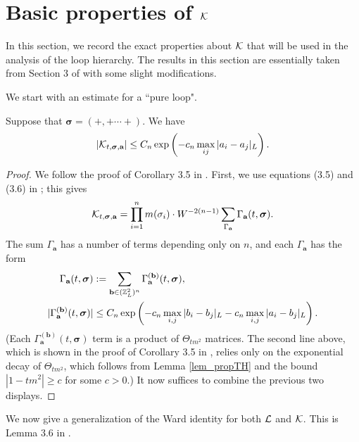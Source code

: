 \section{Basic properties of \texorpdfstring{$\cal K$}{K}}\label{Sec:CalK}


In this section, we record the exact properties about ${\cal K}$ that will be used in the analysis of the loop hierarchy. The results in this section are essentially taken from Section 3 of \cite{YY_25} with some slight modifications. 

We start with an estimate for a ``pure loop".
\begin{lemma}\label{lem_pureloop} Suppose that $\boldsymbol{\sigma}=(+,+\cdots +)$. We have 
\begin{align}\label{res_pureKes}\left|{\cal K}_{t, \boldsymbol{\sigma}, \textbf{a}}\right|\le C_n \exp\left(-c_n\max_{ij}|a_i-a_j|_{L}\right).
\end{align} 
\end{lemma}
\begin{proof}
We follow the proof of Corollary 3.5 in \cite{YY_25}. First, we use equations (3.5) and (3.6) in \cite{YY_25}; this gives 
%
\begin{align*}
{\cal K}_{t,\boldsymbol{\sigma}, \textbf{a}}=\prod_{i=1}^{n}m(\sigma_{i})\cdot W^{-2(n-1)}\sum_{\Gamma_{\textbf{a}}}\Gamma_{\textbf{a}}(t,\boldsymbol{\sigma}).
\end{align*}
%
The sum $\Gamma_{\textbf{a}}$ has a number of terms depending only on $n$, and each $\Gamma_{\textbf{a}}$ has the form
%
\begin{align*}
\Gamma_{\textbf{a}}(t,\boldsymbol{\sigma})&:=\sum_{\textbf{b}\in(\mathbb{Z}_{L}^{2})^{n}}\Gamma^{(\textbf{b})}_{\textbf{a}}(t,\boldsymbol{\sigma}),\\
|\Gamma^{(\textbf{b})}_{\textbf{a}}(t,\boldsymbol{\sigma})|&\leq C_{n}\exp\left(-c_{n}\max_{i,j}|b_{i}-b_{j}|_{L}-c_{n}\max_{i,j}|a_{i}-b_{j}|_{L}\right).
\end{align*}
%
(Each $\Gamma^{(\textbf{b})}_{\textbf{a}}(t,\boldsymbol{\sigma})$ term is a product of $\Theta_{tm^{2}}$ matrices. The second line above, which is shown in the proof of Corollary 3.5 in \cite{YY_25}, relies only on the exponential decay of $\Theta_{tm^{2}}$, which follows from Lemma \ref{lem_propTH} and the bound $|1-tm^{2}|\geq c$ for some $c>0$.) It now suffices to combine the previous two displays.
\end{proof}
We now give a generalization of the Ward identity for both ${\cal L}$ and ${\cal K}$. This is Lemma 3.6 in \cite{YY_25}.


